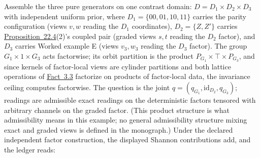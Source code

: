 
Assemble the three pure generators on one contrast domain: \(D = D_1 \times D_2 \times D_3\) with independent uniform prior, where \(D_1 = \{00,01,10,11\}\) carries the parity configuration (views \(v, w\) reading the \(D_1\) coordinates), \(D_2 = \{Z, Z'\}\) carries \hyperlink{stmt:22.4}{Proposition~22.4}(2)'s coupled pair (graded views \(s, t\) reading the \(D_2\) factor), and \(D_3\) carries Worked example E (views \(v_3, w_3\) reading the \(D_3\) factor). The group \(G_1 \times 1 \times G_3\) acts factorwise; its orbit partition is the product \(P_{G_1} \times \top \times P_{G_3}\), and since kernels of factor-local views are cylinder partitions and both lattice operations of \hyperlink{stmt:3.3}{Fact~3.3} factorize on products of factor-local data, the invariance ceiling computes factorwise. The question is the joint \(q = (q_{G_1}, \mathrm{id}_{D_2}, q_{G_3})\); readings are admissible exact readings on the deterministic factors tensored with arbitrary channels on the graded factor. (This product structure is what admissibility means in this example; no general admissibility structure mixing exact and graded views is defined in the monograph.) Under the declared independent factor construction, the displayed Shannon contributions add, and the ledger reads:

